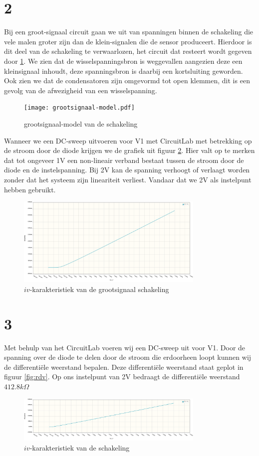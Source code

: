 \documentclass{report}
\begin{document}
\section{2}
Bij een groot-signaal circuit gaan we uit van spanningen binnen de schakeling die vele malen groter zijn dan de klein-signalen die de sensor produceert. Hierdoor is dit deel van de schakeling te verwaarlozen, het circuit dat resteert wordt gegeven door \ref{fig:groot}.
We zien dat de wisselspanningsbron is weggevallen aangezien deze een kleinsignaal inhoudt, deze spanningsbron is daarbij een kortsluiting geworden. Ook zien we dat de condensatoren zijn omgevormd tot open klemmen, dit is een gevolg van de afwezigheid van een wisselspanning.
\begin{figure}[H]
	\centering
	\texttt{[image: grootsignaal-model.pdf]}
	\caption{grootsignaal-model van de schakeling}
	\label{fig:groot}
\end{figure}

\noindent Wanneer we een DC-sweep uitvoeren voor V1 met CircuitLab met betrekking op de stroom door de diode krijgen we de grafiek uit figuur \ref{fig:iv-groot}. Hier valt op te merken dat tot ongeveer 1V een non-lineair verband bestaat tussen de stroom door de diode en de instelspanning. Bij 2V kan de spanning verhoogt of verlaagt worden zonder dat het systeem zijn lineariteit verliest. Vandaar dat we 2V als instelpunt hebben gebruikt.

\begin{figure}[H]
	\centering
	\includegraphics[width=0.8\textwidth]{iv-groot.png}
	\caption{$iv$-karakteristiek van de grootsignaal schakeling}
	\label{fig:iv-groot}
\end{figure}


\section{3}
Met behulp van het CircuitLab voeren wij een DC-sweep uit voor V1. Door de spanning over de diode te delen door de stroom die erdoorheen loopt kunnen wij de differentiële weerstand bepalen. Deze differentiële weerstand staat geplot in figuur \ref{fig:rdv}. Op ons instelpunt van 2V bedraagt de differentiële weerstand $412.8k\Omega$
\begin{figure}[H] 
	\centering
	\includegraphics[width=0.8\textwidth]{iv.png}
	\caption{$iv$-karakteristiek van de schakeling}
	\label{fig:iv}
\end{figure}
\end{document}
